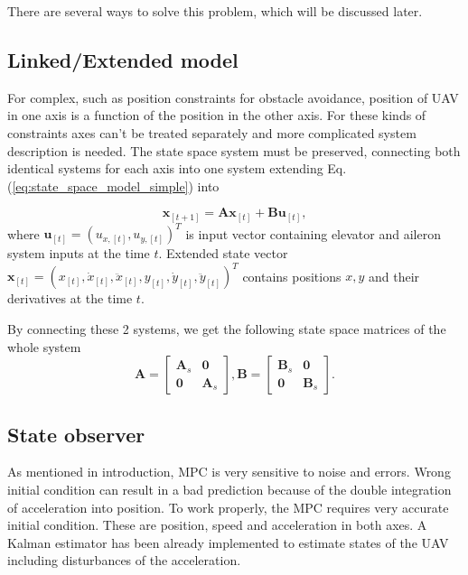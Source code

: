 \documentclass[a4paper,11pt,titlepage]{article}
\begin{document}
There are several ways to solve this problem, which will be discussed later.

\subsection{{\color{red} Linked/Extended} model}		%
For complex, such as position constraints for obstacle avoidance, position of UAV in one axis is a function of the position in the other axis. For these kinds of constraints axes can't be treated separately and more complicated system description is needed. The state space system must be preserved, connecting both identical systems for each axis into one system extending Eq. (\ref{eq:state_space_model_simple}) into 

\begin{equation}
\label{eq:state_space_model_simple}
\textbf{x}_{[t+1]} = \textbf{A} \textbf{x}_{[t]} +\textbf{B} \textbf{u}_{[t]},
\end{equation}
where $\textbf{u}_{[t]} = (u_{x,[t]}, u_{y,[t]})^T$ is input vector containing elevator and aileron system inputs at the time $t$. Extended state vector $\textbf{x}_{[t]} = (x_{[t]}, \dot{x}_{[t]}, \ddot{x}_{[t]}, y_{[t]}, \dot{y}_{[t]}, \ddot{y}_{[t]})^T$ contains positions $x,y$ and their derivatives at the time $t$. 

By connecting these 2 systems, we get the following state space matrices of the whole system
\begin{equation}
\label{eq:state_space}
\textbf{A} = \begin{bmatrix}
	\textbf{A}_s & \textbf{0}	\\
	\textbf{0}   & \textbf{A}_s
\end{bmatrix}, \textbf{B} = \begin{bmatrix}
	\textbf{B}_s & \textbf{0}	\\
	\textbf{0}   & \textbf{B}_s
\end{bmatrix}.
\end{equation}


\subsection{State observer}
As mentioned in introduction, MPC is very sensitive to noise and errors. Wrong initial condition can result in a bad prediction because of the double integration of acceleration into position. To work properly, the MPC requires very accurate initial condition. These are position, speed and acceleration in both axes. A Kalman estimator has been already implemented \cite{tom} to estimate states of the UAV including disturbances of the acceleration.
\end{document}
